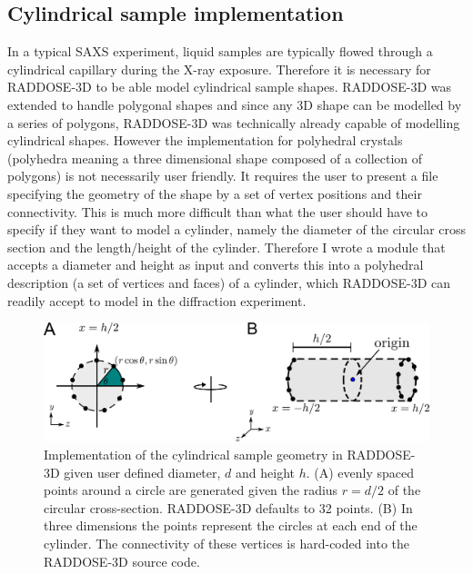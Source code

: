 \subsection{Cylindrical sample implementation}
\label{sub:Cylindrical sample implementation}
In a typical SAXS experiment, liquid samples are typically flowed through a cylindrical capillary during the X-ray exposure.
Therefore it is necessary for RADDOSE-3D to be able model cylindrical sample shapes.
RADDOSE-3D was extended to handle polygonal shapes \cite{bury2015radiation} and since any 3D shape can be modelled by a series of polygons, RADDOSE-3D was technically already capable of modelling cylindrical shapes.
However the implementation for polyhedral crystals (polyhedra meaning a three dimensional shape composed of a collection of polygons) is not necessarily user friendly.
It requires the user to present a file specifying the geometry of the shape by a set of vertex positions and their connectivity.
This is much more difficult than what the user should have to specify if they want to model a cylinder, namely the diameter of the circular cross section and the length/height of the cylinder.
Therefore I wrote a module that accepts a diameter and height as input and converts this into a polyhedral description (a set of vertices and faces) of a cylinder, which RADDOSE-3D can readily accept to model in the diffraction experiment.
\begin{figure}
    \centering
    \includegraphics[width=1\textwidth]{figures/saxs/cylinder_implementation.pdf}
    \caption{Implementation of the cylindrical sample geometry in RADDOSE-3D given user defined diameter, $d$ and height $h$. (A) evenly spaced points around a circle are generated given the radius $r = d/2$ of the circular cross-section. RADDOSE-3D defaults to 32 points. (B) In three dimensions the points represent the circles at each end of the cylinder. The connectivity of these vertices is hard-coded into the RADDOSE-3D source code.}
    \label{fig:Cylindrical implementation}
\end{figure}

